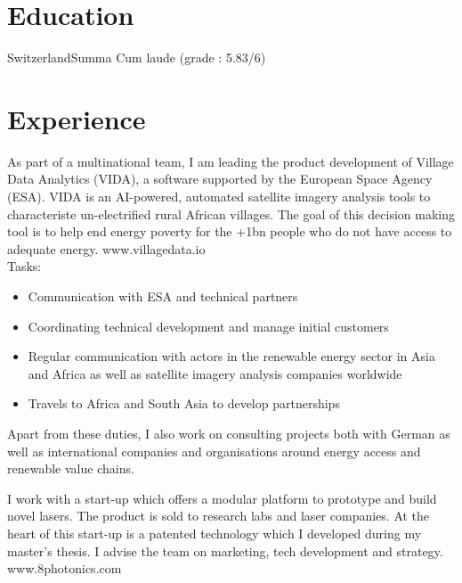 \documentclass[11pt,a4paper,sans]{moderncv} %
\begin{document}
\makecvtitle

\section{Education}
{Switzerland}{Summa Cum laude (grade : 5.83/6)}

\section{Experience}

{As part of a multinational team, I am leading the product development of Village Data Analytics (VIDA), a software supported by the European Space Agency (ESA). VIDA is an AI-powered, automated satellite imagery analysis tools to characteriste un-electrified rural African villages. The goal of this decision making tool is to help end energy poverty for the +1bn people who do not have access to adequate energy. www.villagedata.io\\
Tasks:
\begin{itemize}
\item Communication with ESA and technical partners
\item Coordinating technical development and manage initial customers
\item Regular communication with actors in the renewable energy sector in Asia and Africa as well as satellite imagery analysis companies worldwide
\item Travels to Africa and South Asia to develop partnerships
\end{itemize}
Apart from these duties, I also work on consulting projects both with German as well as international companies and organisations around energy access and renewable value chains.
}

{I work with a start-up which offers a modular platform to prototype and build novel lasers. The product is sold to research labs and laser companies. At the heart of this start-up is a patented technology which I developed during my master's thesis. I advise the team on marketing, tech development and strategy. www.8photonics.com \\
}
\end{document}
